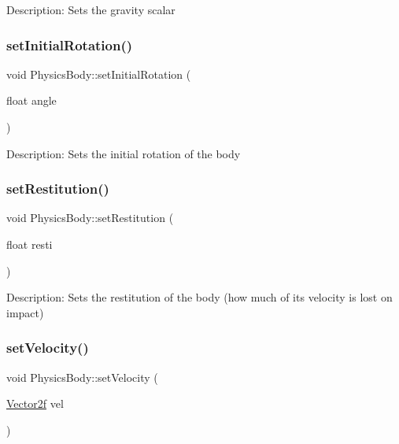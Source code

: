 Description\+: Sets the gravity scalar \mbox{\label{class_physics_body_a648b50e017040632c5298edc65cdc729}} 
\subsubsection{\texorpdfstring{setInitialRotation()}{setInitialRotation()}}
{\footnotesize\ttfamily void Physics\+Body\+::set\+Initial\+Rotation (\begin{DoxyParamCaption}\item[{float}]{angle }\end{DoxyParamCaption})}

Description\+: Sets the initial rotation of the body \mbox{\label{class_physics_body_a97101a5b106a3092eef1340eae81870a}} 
\subsubsection{\texorpdfstring{setRestitution()}{setRestitution()}}
{\footnotesize\ttfamily void Physics\+Body\+::set\+Restitution (\begin{DoxyParamCaption}\item[{float}]{resti }\end{DoxyParamCaption})}

Description\+: Sets the restitution of the body (how much of its velocity is lost on impact) \mbox{\label{class_physics_body_ae9fdcc15def9e51ca02f4dd130fb6595}} 
\subsubsection{\texorpdfstring{setVelocity()}{setVelocity()}}
{\footnotesize\ttfamily void Physics\+Body\+::set\+Velocity (\begin{DoxyParamCaption}\item[{\mbox{\hyperlink{class_vector2f}{Vector2f}}}]{vel }\end{DoxyParamCaption})}

